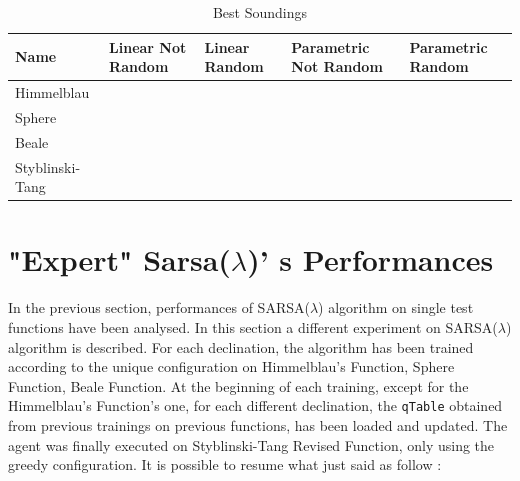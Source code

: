 \begin{table} 
	\centering
	\label{table:BestSoundings}
	\caption{Best Soundings}
	\begin{tabular}
		{l l l l l} \hline Name & Linear Not Random & Linear Random & Parametric Not Random & Parametric Random \\
		\hline Himmelblau & \vtop{\hbox{\strut $2486.938$}\hbox{\strut $(2.67, 1.34)$}\hbox{\strut}\hbox{\strut}} &\cellcolor{blue!25} \vtop{\hbox{\strut $2498.457$}\hbox{\strut $(3.67, -1.57)$}\hbox{\strut}\hbox{\strut}} & \vtop{\hbox{\strut $2485.972$}\hbox{\strut $(-2.1, 3.30)$}\hbox{\strut}\hbox{\strut}} & \vtop{\hbox{\strut $2492.11$}\hbox{\strut $(-2.283, 3.234)$}\hbox{\strut}\hbox{\strut}} \\
		Sphere & \vtop{\hbox{\strut $3484.44$}\hbox{\strut $(-8.8, -0.67)$}\hbox{\strut}\hbox{\strut}} & \vtop{\hbox{\strut $3537.986$}\hbox{\strut $(-3.24, 3.40)$}\hbox{\strut}\hbox{\strut}} &\cellcolor{blue!25} \vtop{\hbox{\strut $3557.722$}\hbox{\strut $(-1.034, -1.099)$}\hbox{\strut}\hbox{\strut}} & \vtop{\hbox{\strut $3553.626$}\hbox{\strut $(1.69, 1.88)$}\hbox{\strut}\hbox{\strut}} \\
		Beale & \vtop{\hbox{\strut $1985.797$}\hbox{\strut $(0, 0)$}\hbox{\strut}\hbox{\strut}} & \vtop{\hbox{\strut $1472.184$}\hbox{\strut $(1.69, 2.269)$}\hbox{\strut}\hbox{\strut}} &\cellcolor{blue!25} \vtop{\hbox{\strut $1997.392$}\hbox{\strut $(-0.77, 1.559)$}\hbox{\strut}\hbox{\strut}} & \vtop{\hbox{\strut $1994.983$}\hbox{\strut $(1.309, -0.89)$}\hbox{\strut}\hbox{\strut}} \\
		Styblinski-Tang & \vtop{\hbox{\strut $5153.086$}\hbox{\strut $(-2.67, -2.67)$}\hbox{\strut}\hbox{\strut}} & \vtop{\hbox{\strut $5126.192$}\hbox{\strut $(3, -2.97)$}\hbox{\strut}\hbox{\strut}} &\cellcolor{blue!25} \vtop{\hbox{\strut $5155.97$}\hbox{\strut $(-2.77, -2.95)$}\hbox{\strut}\hbox{\strut}} & \vtop{\hbox{\strut $5154.053$}\hbox{\strut $(-3.17, -2.99)$}\hbox{\strut}\hbox{\strut}} \\
		\hline
	\end{tabular}
\end{table}

\section{"Expert" Sarsa($\lambda$)' s Performances }

In the previous section, performances of SARSA($\lambda$) algorithm on single test functions have been analysed. In this section a different experiment on SARSA($\lambda$) algorithm is described. For each declination, the algorithm has been trained according to the unique configuration on Himmelblau's Function, Sphere Function, Beale Function. At the beginning of each training, except for the Himmelblau's Function's one, for each different declination, the {\tt qTable} obtained from previous trainings on previous functions, has been loaded and updated. The agent was finally executed on Styblinski-Tang Revised Function, only using the greedy configuration. It is possible to resume what just said as follow :


